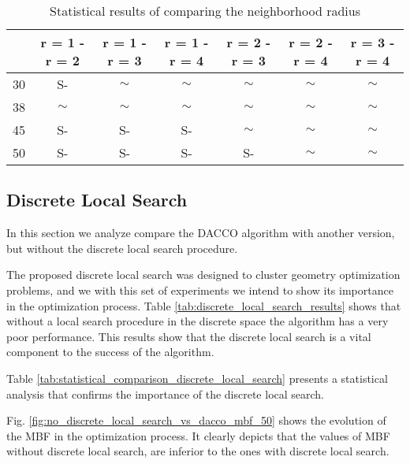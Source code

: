 \begin{landscape}
			\begin{table}[!htdp]
					\begin{center}
						\begin{tabular}{| c | c | c | c | c | c | c |}
							\hline
							~& \textbf{r = 1 - r = 2} & \textbf{r = 1 - r = 3} & \textbf{r = 1 - r = 4} & \textbf{r = 2 - r = 3} & \textbf{r = 2 - r = 4} & \textbf{r = 3 - r = 4} \\ \hline
							30 & S- & $\sim$ & $\sim$ & $\sim$ & $\sim$ & $\sim$ \\ \hline
							38 & $\sim$ & $\sim$ & $\sim$ & $\sim$ & $\sim$ & $\sim$ \\ \hline
							45 & S- & S- & S- & $\sim$ & $\sim$ & $\sim$ \\ \hline
							50 & S- & S- & S- & S- & $\sim$ & $\sim$ \\ \hline
						\end{tabular}
						\caption{Statistical results of comparing the neighborhood radius}
						\label{tab:statistical_comparison_radius}
					\end{center}
			\end{table}
			
			\end{landscape}
			
		\subsection{Discrete Local Search}
		
		In this section we analyze compare the DACCO algorithm with another version, but without the discrete local search procedure. 
		
		The proposed discrete local search was designed to cluster geometry optimization problems, and we with this set of experiments we intend to show its importance in the optimization process.
		Table \ref{tab:discrete_local_search_results} shows that without a local search procedure in the discrete space the algorithm has a very poor performance. This results show that the discrete local search is a vital component to the success of the algorithm. 
		
		Table \ref{tab:statistical_comparison_discrete_local_search} presents a statistical analysis that confirms the importance of the discrete local search. 
		
		Fig. \ref{fig:no_discrete_local_search_vs_dacco_mbf_50} shows the evolution of the MBF in the optimization process. It clearly depicts that the values of MBF without discrete local search, are inferior to the ones with discrete local search.
		
